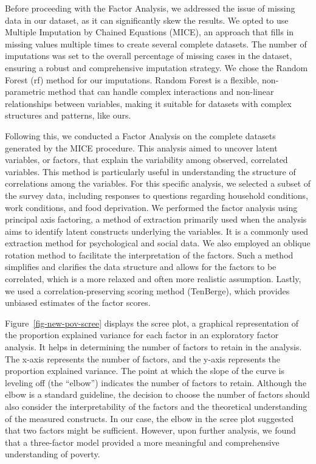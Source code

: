 \documentclass[
]{article}
\begin{document}
Before proceeding with the Factor Analysis, we addressed the issue of
missing data in our dataset, as it can significantly skew the results.
We opted to use Multiple Imputation by Chained Equations (MICE), an
approach that fills in missing values multiple times to create several
complete datasets. The number of imputations was set to the overall
percentage of missing cases in the dataset, ensuring a robust and
comprehensive imputation strategy. We chose the Random Forest (rf)
method for our imputations. Random Forest is a flexible, non-parametric
method that can handle complex interactions and non-linear relationships
between variables, making it suitable for datasets with complex
structures and patterns, like ours.

Following this, we conducted a Factor Analysis on the complete datasets
generated by the MICE procedure. This analysis aimed to uncover latent
variables, or factors, that explain the variability among observed,
correlated variables. This method is particularly useful in
understanding the structure of correlations among the variables. For
this specific analysis, we selected a subset of the survey data,
including responses to questions regarding household conditions, work
conditions, and food deprivation. We performed the factor analysis using
principal axis factoring, a method of extraction primarily used when the
analysis aims to identify latent constructs underlying the variables. It
is a commonly used extraction method for psychological and social data.
We also employed an oblique rotation method to facilitate the
interpretation of the factors. Such a method simplifies and clarifies
the data structure and allows for the factors to be correlated, which is
a more relaxed and often more realistic assumption. Lastly, we used a
correlation-preserving scoring method (TenBerge), which provides
unbiased estimates of the factor scores.

Figure~\ref{fig-new-pov-scree} displays the scree plot, a graphical
representation of the proportion explained variance for each factor in
an exploratory factor analysis. It helps in determining the number of
factors to retain in the analysis. The x-axis represents the number of
factors, and the y-axis represents the proportion explained variance.
The point at which the slope of the curve is leveling off (the
``elbow'') indicates the number of factors to retain. Although the elbow
is a standard guideline, the decision to choose the number of factors
should also consider the interpretability of the factors and the
theoretical understanding of the measured constructs. In our case, the
elbow in the scree plot suggested that two factors might be sufficient.
However, upon further analysis, we found that a three-factor model
provided a more meaningful and comprehensive understanding of poverty.
\end{document}
